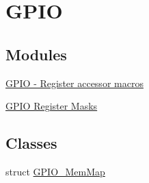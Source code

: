\hypertarget{group___g_p_i_o___peripheral}{}\section{G\+P\+IO}
\label{group___g_p_i_o___peripheral}
\subsection*{Modules}
\begin{DoxyCompactItemize}
\item 
\hyperlink{group___g_p_i_o___register___accessor___macros}{G\+P\+I\+O -\/ Register accessor macros}
\item 
\hyperlink{group___g_p_i_o___register___masks}{G\+P\+I\+O Register Masks}
\end{DoxyCompactItemize}
\subsection*{Classes}
\begin{DoxyCompactItemize}
\item 
struct \hyperlink{struct_g_p_i_o___mem_map}{G\+P\+I\+O\+\_\+\+Mem\+Map}
\end{DoxyCompactItemize}
